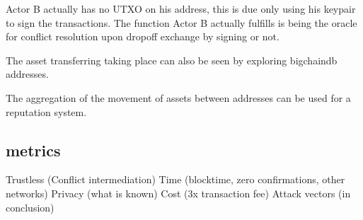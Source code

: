 Actor B actually has no UTXO on his address, this is due only using his keypair to sign the transactions. The function Actor B actually fulfills is being the oracle for conflict resolution upon dropoff exchange by signing or not.\par
The asset transferring taking place can also be seen by exploring bigchaindb addresses. \par
The aggregation of the movement of assets between addresses can be used for a reputation system.

\subsection{metrics}

Trustless (Conflict intermediation)
Time (blocktime, zero confirmations, other networks)
Privacy (what is known)
Cost (3x transaction fee)
Attack vectors (in conclusion)
